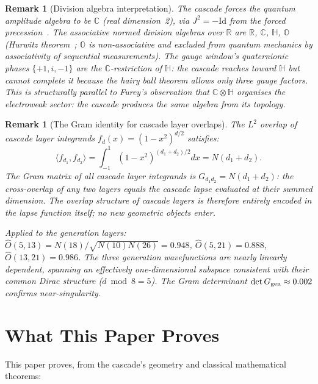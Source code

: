 \documentclass[12pt,a4paper]{article}
\newtheorem{remark}[theorem]{Remark}
\begin{document}
\begin{remark}[Division algebra interpretation]
The cascade forces the quantum amplitude algebra to be $\mathbb{C}$ (real dimension~2), via
$J^2=-\mathrm{Id}$ from the forced precession~\cite{paperII}. The associative normed division
algebras over $\mathbb{R}$ are $\mathbb{R}$, $\mathbb{C}$, $\mathbb{H}$, $\mathbb{O}$
(Hurwitz theorem~\cite{hurwitz}; $\mathbb{O}$ is non-associative and excluded from quantum
mechanics by associativity of sequential measurements). The gauge window's quaternionic
phases $\{+1,i,-1\}$ are the $\mathbb{C}$-restriction of $\mathbb{H}$: the cascade reaches
toward $\mathbb{H}$ but cannot complete it because the hairy ball theorem allows only three
gauge factors. This is structurally parallel to Furey's observation that $\mathbb{C}\otimes
\mathbb{H}$ organises the electroweak sector: the cascade produces the same algebra from
its topology.
\end{remark}

\begin{remark}[The Gram identity for cascade layer overlaps]\label{rem:gram}
The $L^2$ overlap of cascade layer integrands $f_d(x)=(1-x^2)^{d/2}$ satisfies:
\[
\langle f_{d_1},f_{d_2}\rangle = \int_{-1}^1(1-x^2)^{(d_1+d_2)/2}dx = N(d_1+d_2).
\]
The Gram matrix of all cascade layer integrands is $G_{d_1 d_2}=N(d_1+d_2)$: the
cross-overlap of any two layers equals the cascade lapse evaluated at their summed dimension.
The overlap structure of cascade layers is therefore entirely encoded in the lapse function
itself; no new geometric objects enter.

Applied to the generation layers: $\hat{O}(5,13)=N(18)/\sqrt{N(10)N(26)}=0.948$,
$\hat{O}(5,21)=0.888$, $\hat{O}(13,21)=0.986$. The three generation wavefunctions are
nearly linearly dependent, spanning an effectively one-dimensional subspace consistent with
their common Dirac structure ($d\bmod 8=5$). The Gram determinant
$\det G_{\rm gen}\approx 0.002$ confirms near-singularity.
\end{remark}

\section{What This Paper Proves}

This paper proves, from the cascade's geometry and classical mathematical theorems:
\end{document}
